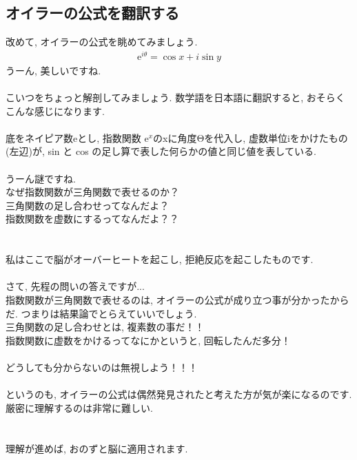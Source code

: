 \documentclass[11pt,a4paper]{jreport}
\begin{document}
\subsection{オイラーの公式を翻訳する}
改めて, オイラーの公式を眺めてみましょう.\\
\begin{eqnarray}
\mathrm{e}^{i\theta} = \cos x + i\sin y
\end{eqnarray}
うーん, 美しいですね.\\
\\
こいつをちょっと解剖してみましょう. 数学語を日本語に翻訳すると, おそらくこんな感じになります.
\\
\\
底をネイピア数eとし, 指数関数 $\mathrm{e}^x$のxに角度Θを代入し, 虚数単位iをかけたもの(左辺)が, sin と cos の足し算で表した何らかの値と同じ値を表している.\\
\\
うーん謎ですね.\\
なぜ指数関数が三角関数で表せるのか？\\
三角関数の足し合わせってなんだよ？\\
指数関数を虚数にするってなんだよ？？\\
\\
\\
私はここで脳がオーバーヒートを起こし, 拒絶反応を起こしたものです.\\
\\
さて, 先程の問いの答えですが...\\
指数関数が三角関数で表せるのは, オイラーの公式が成り立つ事が分かったからだ. つまりは結果論でとらえていいでしょう. \\
三角関数の足し合わせとは, 複素数の事だ！！\\
指数関数に虚数をかけるってなにかというと, 回転したんだ多分！\\
\\
どうしても分からないのは無視しよう！！！\\
\\
というのも, オイラーの公式は偶然発見されたと考えた方が気が楽になるのです. 厳密に理解するのは非常に難しい.\\
\\
\\
理解が進めば, おのずと脳に適用されます.
\end{document}
